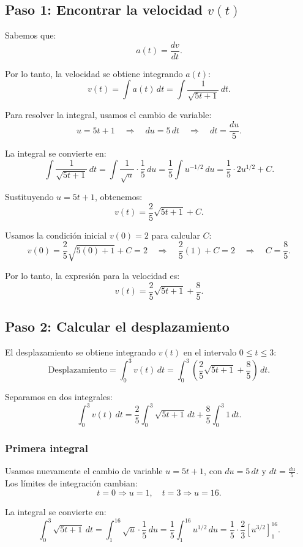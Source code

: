 \documentclass[11pt,letterpaper]{article}
\begin{document}
\subsection*{Paso 1: Encontrar la velocidad \(v(t)\)}

Sabemos que:
\[
a(t) = \frac{dv}{dt}.
\]

Por lo tanto, la velocidad se obtiene integrando \(a(t)\):
\[
v(t) = \int a(t) \, dt = \int \frac{1}{\sqrt{5t + 1}} \, dt.
\]

Para resolver la integral, usamos el cambio de variable:
\[
u = 5t + 1 \quad \Rightarrow \quad du = 5 \, dt \quad \Rightarrow \quad dt = \frac{du}{5}.
\]

La integral se convierte en:
\[
\int \frac{1}{\sqrt{5t + 1}} \, dt = \int \frac{1}{\sqrt{u}} \cdot \frac{1}{5} \, du = \frac{1}{5} \int u^{-1/2} \, du = \frac{1}{5} \cdot 2u^{1/2} + C.
\]

Sustituyendo \(u = 5t + 1\), obtenemos:
\[
v(t) = \frac{2}{5} \sqrt{5t + 1} + C.
\]

Usamos la condición inicial \(v(0) = 2\) para calcular \(C\):
\[
v(0) = \frac{2}{5} \sqrt{5(0) + 1} + C = 2 \quad \Rightarrow \quad \frac{2}{5}(1) + C = 2 \quad \Rightarrow \quad C = \frac{8}{5}.
\]

Por lo tanto, la expresión para la velocidad es:
\[
v(t) = \frac{2}{5} \sqrt{5t + 1} + \frac{8}{5}.
\]

\subsection*{Paso 2: Calcular el desplazamiento}

El desplazamiento se obtiene integrando \(v(t)\) en el intervalo \(0 \leq t \leq 3\):
\[
\text{Desplazamiento} = \int_{0}^{3} v(t) \, dt = \int_{0}^{3} \left( \frac{2}{5} \sqrt{5t + 1} + \frac{8}{5} \right) \, dt.
\]

Separamos en dos integrales:
\[
\int_{0}^{3} v(t) \, dt = \frac{2}{5} \int_{0}^{3} \sqrt{5t + 1} \, dt + \frac{8}{5} \int_{0}^{3} 1 \, dt.
\]

\subsubsection*{Primera integral}
Usamos nuevamente el cambio de variable \(u = 5t + 1\), con \(du = 5 \, dt\) y \(dt = \frac{du}{5}\). Los límites de integración cambian:
\[
t = 0 \Rightarrow u = 1, \quad t = 3 \Rightarrow u = 16.
\]

La integral se convierte en:
\[
\int_{0}^{3} \sqrt{5t + 1} \, dt = \int_{1}^{16} \sqrt{u} \cdot \frac{1}{5} \, du = \frac{1}{5} \int_{1}^{16} u^{1/2} \, du = \frac{1}{5} \cdot \frac{2}{3} \left[ u^{3/2} \right]_{1}^{16}.
\]
\end{document}
